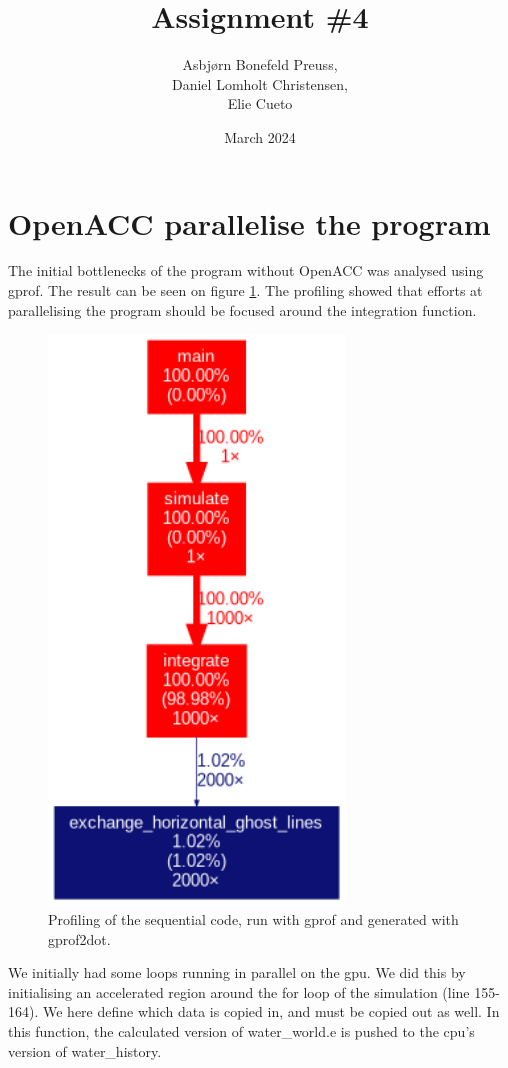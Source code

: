 \documentclass{article}
\title{Assignment \#4}
\author{Asbjørn Bonefeld Preuss,\\ Daniel Lomholt Christensen,\\ Elie Cueto}
\date{March 2024}
\begin{document}
\maketitle
\section{OpenACC parallelise the program}
The initial bottlenecks of the program without OpenACC was analysed using gprof. The result can be seen on figure \ref{fig:profiling:seq}. The profiling showed that efforts at parallelising the program should be focused around the integration function.
\begin{figure}[H]
    \includegraphics[width=0.7\textwidth]{./figures/sequential_profile.png}
    \centering
    \caption{Profiling of the sequential code, run with gprof and generated with gprof2dot.}
    \label{fig:profiling:seq}
\end{figure}
We initially had some loops running in parallel on the gpu. 
We did this by initialising an accelerated region around the for loop of the simulation (line 155-164).
We here define which data is copied in, and must be copied out as well. In this function, the calculated version of water_world.e is pushed to the cpu's version of water_history.
\end{document}

